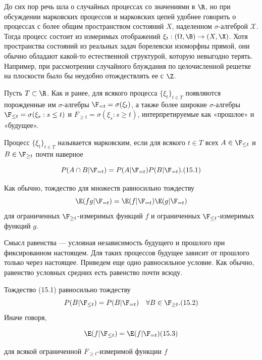 До сих пор речь шла о случайных процессах со значениями в $\R$,
но при обсуждении марковских процессов и марковских цепей удобнее говорить о процессах с более общим пространством состояний $X$, наделенном $\sigma$-алгеброй $\mathcal{X}$. Тогда процесс состоит из измеримых отображений $\xi_t: (\Omega, \B) \to (X, \X)$. Хотя пространства состояний из реальных задач борелевски изоморфны прямой, они обычно обладают какой-то естественной структурой, которую невыгодно терять. Например, при
рассмотрении случайного блуждания по целочисленной решетке на
плоскости было бы неудобно отождествлять ее с $\Z$.

Пусть $T \subset \R$.
Как и ранее, для всякого процесса $\{\xi_t\}_{t \in T}$ появляются порожденные им $\sigma$-алгебры $\F_{=t} = \sigma(\xi_t)$, а также более широкие $\sigma$-алгебры
$\F_{\leq t} = \sigma(\xi_s : s \leq t)$ и $F_{\geq t} = \sigma(\xi_s : s \geq t)$, интерпретируемые как «прошлое» и «будущее».

\begin{definition}
    Процесс $\{\xi_t\}_{t \in T}$ называется марковским, если для всякого $t \in T$ всех $A \in \F_{\leq t}$ и $B \in \F_{\geq t}$ почти наверное 
    
    \[ P(A \cap B|\F_{=t}) = P(A|\F_{=t})P(B|\F_{=t}). (15.1) \]
    
    Как обычно, тождество для множеств равносильно тождеству
    \[ \E(fg|\F_{=t}) = \E(f|\F_{=t})\E(g|\F_{=t}) \]
    для ограниченных $\F_{\geq t}$-измеримых функций $f$ и ограниченных $\F_{\leq t}$-измеримых функций $g$.
\end{definition}

Смысл равенства — условная независимость будущего и прошлого при фиксированном настоящем. Для таких процессов будущее зависит от прошлого только через настоящее. Приведем еще одно равносильное условие. Как обычно, равенство условных средних есть равенство почти всюду.

\begin{lemma}
    Тождество (15.1) равносильно тождеству
    \[ P(B|\F_{\leq t}) = P(B|\F_{=t}) \quad \forall B \in \F_{\geq t}. (15.2) \]
    Иначе говоря,
    
    \[ \E(f|\F_{\leq t}) = \E(f|\F_{=t}) (15.3) \]
    
    для всякой ограниченной $F_{\geq t}$-измеримой функции $f$
\end{lemma}

